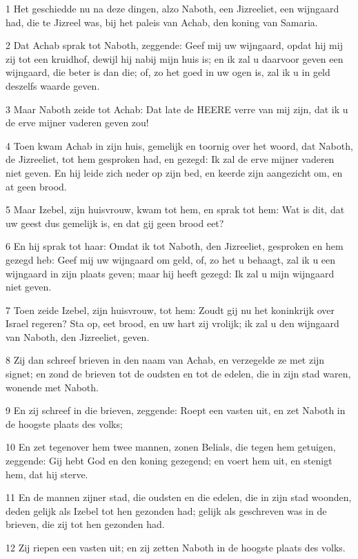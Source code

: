 \par 1 Het geschiedde nu na deze dingen, alzo Naboth, een Jizreeliet, een wijngaard had, die te Jizreel was, bij het paleis van Achab, den koning van Samaria.
\par 2 Dat Achab sprak tot Naboth, zeggende: Geef mij uw wijngaard, opdat hij mij zij tot een kruidhof, dewijl hij nabij mijn huis is; en ik zal u daarvoor geven een wijngaard, die beter is dan die; of, zo het goed in uw ogen is, zal ik u in geld deszelfs waarde geven.
\par 3 Maar Naboth zeide tot Achab: Dat late de HEERE verre van mij zijn, dat ik u de erve mijner vaderen geven zou!
\par 4 Toen kwam Achab in zijn huis, gemelijk en toornig over het woord, dat Naboth, de Jizreeliet, tot hem gesproken had, en gezegd: Ik zal de erve mijner vaderen niet geven. En hij leide zich neder op zijn bed, en keerde zijn aangezicht om, en at geen brood.
\par 5 Maar Izebel, zijn huisvrouw, kwam tot hem, en sprak tot hem: Wat is dit, dat uw geest dus gemelijk is, en dat gij geen brood eet?
\par 6 En hij sprak tot haar: Omdat ik tot Naboth, den Jizreeliet, gesproken en hem gezegd heb: Geef mij uw wijngaard om geld, of, zo het u behaagt, zal ik u een wijngaard in zijn plaats geven; maar hij heeft gezegd: Ik zal u mijn wijngaard niet geven.
\par 7 Toen zeide Izebel, zijn huisvrouw, tot hem: Zoudt gij nu het koninkrijk over Israel regeren? Sta op, eet brood, en uw hart zij vrolijk; ik zal u den wijngaard van Naboth, den Jizreeliet, geven.
\par 8 Zij dan schreef brieven in den naam van Achab, en verzegelde ze met zijn signet; en zond de brieven tot de oudsten en tot de edelen, die in zijn stad waren, wonende met Naboth.
\par 9 En zij schreef in die brieven, zeggende: Roept een vasten uit, en zet Naboth in de hoogste plaats des volks;
\par 10 En zet tegenover hem twee mannen, zonen Belials, die tegen hem getuigen, zeggende: Gij hebt God en den koning gezegend; en voert hem uit, en stenigt hem, dat hij sterve.
\par 11 En de mannen zijner stad, die oudsten en die edelen, die in zijn stad woonden, deden gelijk als Izebel tot hen gezonden had; gelijk als geschreven was in de brieven, die zij tot hen gezonden had.
\par 12 Zij riepen een vasten uit; en zij zetten Naboth in de hoogste plaats des volks.
